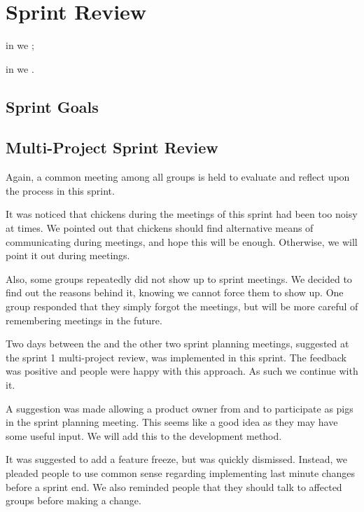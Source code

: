 \chapter{Sprint Review}\label{chap:sprint2_end}

\begin{chapterorganization}
  \item in  we ;
  \item in  we .
\end{chapterorganization}

\section{Sprint Goals}\label{sec:s2_goals}



\section{Multi-Project Sprint Review}\label{sec:s2_multiprj_review}
Again, a common meeting among all groups is held to evaluate and reflect upon the process in this sprint.

It was noticed that chickens during the meetings of this sprint had been too noisy at times. We pointed out that chickens should find alternative means of communicating during meetings, and hope this will be enough. Otherwise, we will point it out during meetings.

Also, some groups repeatedly did not show up to sprint meetings. We decided to find out the reasons behind it, knowing we cannot force them to show up. One group responded that they simply forgot the meetings, but will be more careful of remembering meetings in the future.

Two days between the \gui and the other two sprint planning meetings, suggested at the sprint 1 multi-project review, was implemented in this sprint. The feedback was positive and people were happy with this approach. As such we continue with it.

A suggestion was made allowing a product owner from \db and \bd to participate as pigs in the \gui sprint planning meeting. This seems like a good idea as they may have some useful input. We will add this to the development method.

It was suggested to add a feature freeze, but was quickly dismissed. Instead, we pleaded people to use common sense regarding implementing last minute changes before a sprint end. We also reminded people that they should talk to affected groups before making a change.